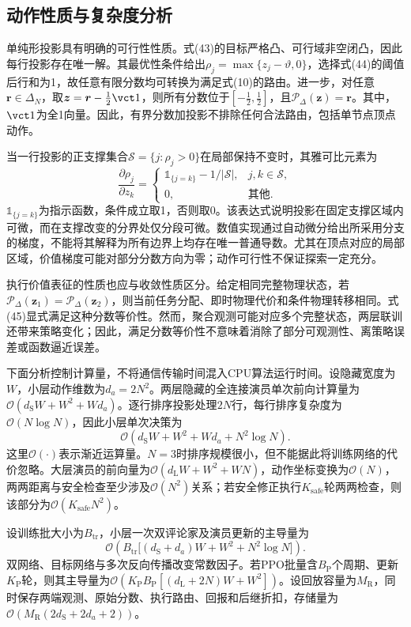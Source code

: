 \subsection{动作性质与复杂度分析}
单纯形投影具有明确的可行性性质。式(43)的目标严格凸、可行域非空闭凸，因此每行投影存在唯一解。其最优性条件给出$\rho_j=\max\{z_j-\vartheta,0\}$，选择式(44)的阈值后行和为1，故任意有限分数均可转换为满足式(10)的路由。进一步，对任意$\boldsymbol r\in\Delta_N$，取$\boldsymbol z=\boldsymbol r-\frac12\vct1$，则所有分数位于$[-\frac12,\frac12]$，且$\mathcal P_\Delta(\boldsymbol z)=\boldsymbol r$。其中，$\vct1$为全1向量。因此，有界分数加投影不排除任何合法路由，包括单节点顶点动作。

当一行投影的正支撑集合$\mathcal S=\{j:\rho_j>0\}$在局部保持不变时，其雅可比元素为
\[
\frac{\partial\rho_j}{\partial z_k}=
 \begin{cases}
 \mathbb{1}_{\{j=k\}}-1/|\mathcal S|,&j,k\in\mathcal S,\\
 0,&\text{其他}.
 \end{cases}\tag{50}
\]
$\mathbb{1}_{\{j=k\}}$为指示函数，条件成立取1，否则取0。该表达式说明投影在固定支撑区域内可微，而在支撑改变的分界处仅分段可微。数值实现通过自动微分给出所采用分支的梯度，不能将其解释为所有边界上均存在唯一普通导数。尤其在顶点对应的局部区域，价值梯度可能对部分分数方向为零；动作可行性不保证探索一定充分。

执行价值表征的性质也应与收敛性质区分。给定相同完整物理状态，若$\mathcal P_\Delta(\boldsymbol z_1)=\mathcal P_\Delta(\boldsymbol z_2)$，则当前任务分配、即时物理代价和条件物理转移相同。式(45)显式满足这种分数等价性。然而，聚合观测可能对应多个完整状态，两层联训还带来策略变化；因此，满足分数等价性不意味着消除了部分可观测性、离策略误差或函数逼近误差。

下面分析控制计算量，不将通信传输时间混入CPU算法运行时间。设隐藏宽度为$W$，小层动作维数为$d_a=2N^2$。两层隐藏的全连接演员单次前向计算量为$\mathcal O(d_{\mathrm S}W+W^2+Wd_a)$。逐行排序投影处理$2N$行，每行排序复杂度为$\mathcal O(N\log N)$，因此小层单次决策为
\[
\mathcal O\!\left(d_{\mathrm S}W+W^2+Wd_a+N^2\log N\right).\tag{51}
\]
这里$\mathcal O(\cdot)$表示渐近运算量。$N=3$时排序规模很小，但不能据此将训练网络的代价忽略。大层演员的前向量为$\mathcal O(d_{\mathrm L}W+W^2+WN)$，动作坐标变换为$\mathcal O(N)$，两两距离与安全检查至少涉及$\mathcal O(N^2)$关系；若安全修正执行$K_{\mathrm{safe}}$轮两两检查，则该部分为$\mathcal O(K_{\mathrm{safe}}N^2)$。

设训练批大小为$B_{\mathrm{tr}}$，小层一次双评论家及演员更新的主导量为
\[
\mathcal O\!\left(
 B_{\mathrm{tr}}\big[(d_{\mathrm S}+d_a)W+W^2+N^2\log N\big]
 \right).\tag{52}
\]
双网络、目标网络与多次反向传播改变常数因子。若PPO批量含$B_{\mathrm P}$个周期、更新$K_{\mathrm P}$轮，则其主导量为$\mathcal O(K_{\mathrm P}B_{\mathrm P}[(d_{\mathrm L}+2N)W+W^2])$。设回放容量为$M_{\mathrm R}$，同时保存两端观测、原始分数、执行路由、回报和后继折扣，存储量为$\mathcal O(M_{\mathrm R}(2d_{\mathrm S}+2d_a+2))$。

